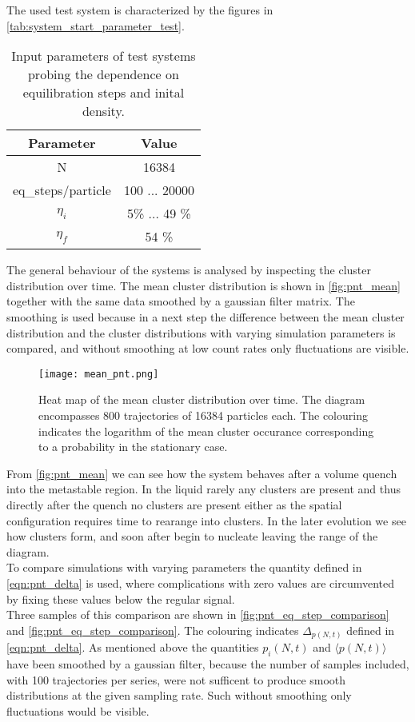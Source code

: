 The used test system is characterized by the figures in \autoref{tab:system_start_parameter_test}.

\begin{table}
\centering
\begin{tabular}{c|c}
Parameter & Value \\ \hline
N & 16384 \\
eq\_steps/particle & 100 ... 20000 \\
$\eta_i$ & 5\% ... 49 \% \\
$\eta_f$ & 54 \% \\
\end{tabular}
\caption{Input parameters of test systems probing the dependence on equilibration steps and inital density.}
\label{tab:system_start_parameter_test}
\end{table}

The general behaviour of the systems is analysed by inspecting the cluster distribution over time. The mean cluster distribution is shown in \autoref{fig:pnt_mean} together with the same data smoothed by a gaussian filter matrix. The smoothing is used because in a next step the difference between the mean cluster distribution and the cluster distributions with varying simulation parameters is compared, and without smoothing at low count rates only fluctuations are visible.\\


\begin{figure}[h!]
\centering
\texttt{[image: mean\_pnt.png]}
\caption{Heat map of the mean cluster distribution over time. The diagram encompasses 800 trajectories of 16384 particles each. The colouring indicates the logarithm of the mean cluster occurance corresponding to a probability in the stationary case.}
\label{fig:pnt_mean}
\end{figure}

From \autoref{fig:pnt_mean} we can see how the system behaves after a volume quench into the metastable region. In the liquid rarely any clusters are present and thus directly after the quench no clusters are present either as the spatial configuration requires time to rearange into clusters. In the later evolution we see how clusters form, and soon after begin to nucleate leaving the range of the diagram.\\

To compare simulations with varying parameters the quantity defined in \autoref{eqn:pnt_delta} is used, where complications with zero values are circumvented by fixing these values below the regular signal.\\ Three samples of this comparison are shown in \autoref{fig:pnt_eq_step_comparison} and \autoref{fig:pnt_eq_step_comparison}. The colouring indicates $\Delta_{p(N,t)}$ defined in \autoref{eqn:pnt_delta}. As mentioned above the quantities $p_i(N,t)$ and $\langle p(N,t) \rangle$ have been smoothed by a gaussian filter, because the number of samples included, with 100 trajectories per series, were not sufficent to produce smooth distributions at the given sampling rate. Such without smoothing only fluctuations would be visible.\\ 


